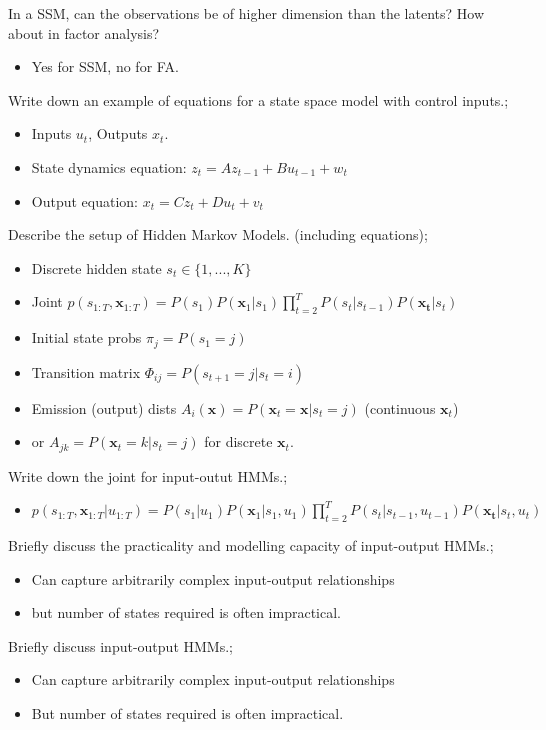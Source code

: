\documentclass{article}
\begin{document}
In a SSM, can the observations be of higher dimension than the latents? How about in factor analysis? \begin{itemize}
    \item Yes for SSM, no for FA.
\end{itemize}

Write down an example of equations for a state space model with control inputs.; \begin{itemize}
    \item Inputs $u_t$, Outputs $x_t$.
    \item State dynamics equation: $z_t=Az_{t-1}+Bu_{t-1}+w_t$
    \item Output equation: $x_t=Cz_t+Du_t+v_t$
\end{itemize}

Describe the setup of Hidden Markov Models. (including equations); \begin{itemize}
    \item Discrete hidden state $s_t\in \{1,...,K\}$
    \item Joint $p(s_{1:T}, \mathbf{x}_{1:T})=P(s_1)P(\mathbf{x}_1|s_1)\prod_{t=2}^TP(s_t|s_{t-1})P(\mathbf{x_t}|s_t)$
    \item Initial state probs $\pi_j = P(s_1=j)$
    \item Transition matrix $\Phi_{ij}=P(s_{t+1}=j|s_t=i)$
    \item Emission (output) dists $A_i(\mathbf{x})=P(\mathbf{x}_t=\mathbf{x}|s_t=j)$ (continuous $\mathbf{x}_t$)
    \item or $A_{jk}=P(\mathbf{x}_t=k|s_t=j)$ for discrete $\mathbf{x}_t$.
\end{itemize}

Write down the joint for input-outut HMMs.;
\begin{itemize}
    \item $p(s_{1:T}, \mathbf{x}_{1:T}|u_{1:T})=P(s_1|u_1)P(\mathbf{x}_1|s_1, u_1)\prod_{t=2}^TP(s_t|s_{t-1}, u_{t-1})P(\mathbf{x_t}|s_t, u_t)$
\end{itemize}

Briefly discuss the practicality and modelling capacity of input-output HMMs.; \begin{itemize}
    \item Can capture arbitrarily complex input-output relationships
    \item but number of states required is often impractical.
\end{itemize}
Briefly discuss input-output HMMs.; \begin{itemize}
    \item Can capture arbitrarily complex input-output relationships
    \item But number of states required is often impractical.
\end{itemize}
\end{document}
